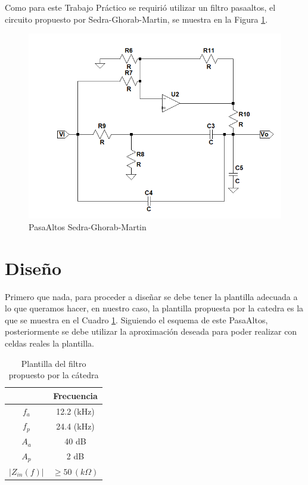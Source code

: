 Como para este Trabajo Práctico se requirió utilizar un filtro pasaaltos,
el circuito propuesto por Sedra-Ghorab-Martin, se muestra en la Figura
\ref{3_2}.

\begin{figure}[H]
\begin{centering}
\includegraphics[scale=0.5]{../Ex3/Resources/SedraCir}
\par\end{centering}
\caption{PasaAltos Sedra-Ghorab-Martin}
\label{3_2}

\end{figure}

\section{Diseño}

Primero que nada, para proceder a diseñar se debe tener la plantilla
adecuada a lo que queramos hacer, en nuestro caso, la plantilla propuesta
por la catedra es la que se muestra en el Cuadro \ref{3_c_1}. Siguiendo
el esquema de este PasaAltos, posteriormente se debe utilizar la aproximación
deseada para poder realizar con celdas reales la plantilla.

\begin{table}[H]
\begin{centering}
\begin{tabular}{|c|c|}
\hline 
 & Frecuencia\tabularnewline
\hline 
\hline 
$f_{a}$ & 12.2 (kHz)\tabularnewline
\hline 
$f_{p}$ & 24.4 (kHz)\tabularnewline
\hline 
$A_{a}$ & 40 dB\tabularnewline
\hline 
$A_{p}$ & 2 dB\tabularnewline
\hline 
$\left|Z_{in}(f)\right|$ & $\geq50\,(k\Omega)$\tabularnewline
\hline 
\end{tabular}
\par\end{centering}
\caption{Plantilla del filtro propuesto por la cátedra}
\label{3_c_1}

\end{table}


